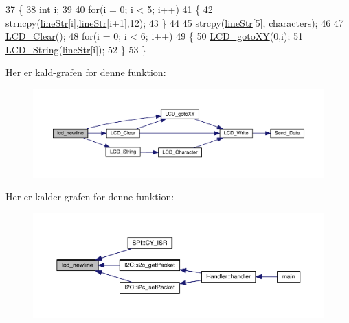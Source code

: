 \begin{DoxyCode}
37 \{
38   \textcolor{keywordtype}{int} i;
39   
40   \textcolor{keywordflow}{for}(i = 0; i < 5; i++)
41   \{
42     strncpy(\hyperlink{class_l_c_d_a51a220275e6d21942189276ef7d9e7c3}{lineStr}[i],\hyperlink{class_l_c_d_a51a220275e6d21942189276ef7d9e7c3}{lineStr}[i+1],12);
43   \}
44   
45   strcpy(\hyperlink{class_l_c_d_a51a220275e6d21942189276ef7d9e7c3}{lineStr}[5], characters);
46   
47   \hyperlink{_nokia5110_l_c_d_8c_ae60d0b62d7eb3fa31266c095d7b3c245}{LCD\_Clear}();
48   \textcolor{keywordflow}{for}(i = 0; i < 6; i++)
49   \{
50     \hyperlink{_nokia5110_l_c_d_8c_adde1a4c2e7bd6bc1bbeb7694db45925b}{LCD\_gotoXY}(0,i);
51     \hyperlink{_nokia5110_l_c_d_8c_a4c2c90307f23817e8445be5c6ca537c5}{LCD\_String}(\hyperlink{class_l_c_d_a51a220275e6d21942189276ef7d9e7c3}{lineStr}[i]);
52   \}
53 \}
\end{DoxyCode}


Her er kald-\/grafen for denne funktion\+:
\nopagebreak
\begin{figure}[H]
\begin{center}
\leavevmode
\includegraphics[width=350pt]{df/dd6/class_l_c_d_a507dd352aee8161dc556e3d1439a2be2_cgraph}
\end{center}
\end{figure}




Her er kalder-\/grafen for denne funktion\+:
\nopagebreak
\begin{figure}[H]
\begin{center}
\leavevmode
\includegraphics[width=350pt]{df/dd6/class_l_c_d_a507dd352aee8161dc556e3d1439a2be2_icgraph}
\end{center}
\end{figure}




